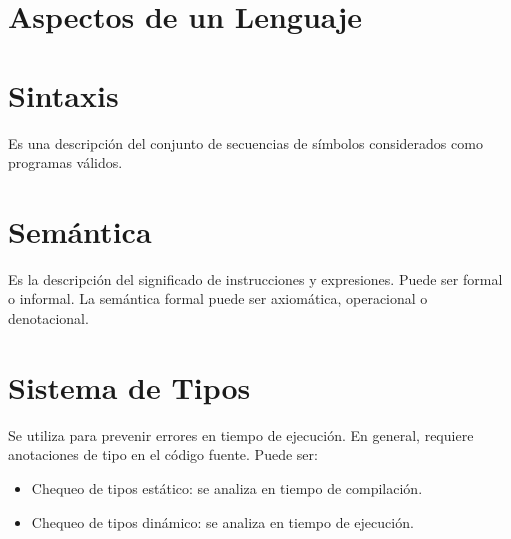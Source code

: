 \section{Aspectos de un Lenguaje}

\section{Sintaxis}

Es una descripción del conjunto de secuencias de símbolos considerados como programas válidos.

\section{Semántica}

Es la descripción del significado de instrucciones y expresiones. Puede ser formal o informal.
La semántica formal puede ser axiomática, operacional o denotacional.

\section{Sistema de Tipos}

Se utiliza para prevenir errores en tiempo de ejecución. En general, requiere anotaciones de tipo en el código fuente. Puede ser:

\begin{itemize}
  \item Chequeo de tipos estático: se analiza en tiempo de compilación.
  \item Chequeo de tipos dinámico: se analiza en tiempo de ejecución.
\end{itemize}
